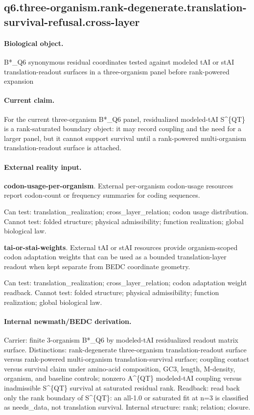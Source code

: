 \subsection{q6.three-organism.rank-degenerate.translation-survival-refusal.cross-layer}

\paragraph{Biological object.} B*\_Q6 synonymous residual coordinates tested against modeled tAI or stAI translation-readout surfaces in a three-organism panel before rank-powered expansion

\paragraph{Current claim.} For the current three-organism B*\_Q6 panel, residualized modeled-tAI S\textasciicircum{}\{QT\} is a rank-saturated boundary object: it may record coupling and the need for a larger panel, but it cannot support survival until a rank-powered multi-organism translation-readout surface is attached.

\paragraph{External reality input.}
\textbf{codon-usage-per-organism}. External per-organism codon-usage resources report codon-count or frequency summaries for coding sequences.

Can test: translation\_realization; cross\_layer\_relation; codon usage distribution. Cannot test: folded structure; physical admissibility; function realization; global biological law.

\textbf{tai-or-stai-weights}. External tAI or stAI resources provide organism-scoped codon adaptation weights that can be used as a bounded translation-layer readout when kept separate from BEDC coordinate geometry.

Can test: translation\_realization; cross\_layer\_relation; codon adaptation weight readback. Cannot test: folded structure; physical admissibility; function realization; global biological law.

\paragraph{Internal newmath/BEDC derivation.} Carrier: finite 3-organism B*\_Q6 by modeled-tAI residualized readout matrix surface. Distinctions: rank-degenerate three-organism translation-readout surface versus rank-powered multi-organism translation-survival surface; coupling contact versus survival claim under amino-acid composition, GC3, length, M-density, organism, and baseline controls; nonzero A\textasciicircum{}\{QT\} modeled-tAI coupling versus inadmissible S\textasciicircum{}\{QT\} survival at saturated residual rank. Readback: read back only the rank boundary of S\textasciicircum{}\{QT\}: an all-1.0 or saturated fit at n=3 is classified as needs\_data, not translation survival. Internal structure: rank; relation; closure.

